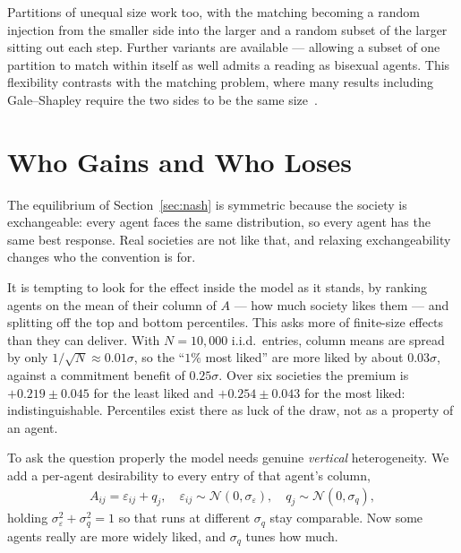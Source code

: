 \documentclass[sigconf,anonymous]{aamas}
\newcommand{\N}{\mathcal{N}}
\begin{document}
Partitions of unequal size work too, with the matching becoming a random
injection from the smaller side into the larger and a random subset of the
larger sitting out each step. Further variants are available --- allowing a
subset of one partition to match within itself as well admits a reading as
bisexual agents. This flexibility contrasts with the matching problem, where
many results including Gale--Shapley require the two sides to be the same
size~\cite{roth1992two}.


\section{Who Gains and Who Loses}
\label{sec:who}

The equilibrium of Section~\ref{sec:nash} is symmetric because the society is
exchangeable: every agent faces the same distribution, so every agent has the
same best response. Real societies are not like that, and relaxing
exchangeability changes who the convention is for.

It is tempting to look for the effect inside the model as it stands, by ranking
agents on the mean of their column of $A$ --- how much society likes them --- and
splitting off the top and bottom percentiles. This asks more of finite-size
effects than they can deliver. With $N = 10{,}000$ i.i.d.\ entries, column means
are spread by only $1/\sqrt{N} \approx 0.01\sigma$, so the ``$1\%$ most liked''
are more liked by about $0.03\sigma$, against a commitment benefit of
$0.25\sigma$. Over six societies the premium is $+0.219 \pm 0.045$ for the least
liked and $+0.254 \pm 0.043$ for the most liked: indistinguishable. Percentiles
exist there as luck of the draw, not as a property of an agent.

To ask the question properly the model needs genuine \emph{vertical}
heterogeneity. We add a per-agent desirability to every entry of that agent's
column,
%
\begin{align}
  A_{ij} = \varepsilon_{ij} + q_j,
  \quad
  \varepsilon_{ij} \sim \N(0, \sigma_\varepsilon),
  \quad
  q_j \sim \N(0, \sigma_q),
  \label{eq:quality}
\end{align}
%
holding $\sigma_\varepsilon^2 + \sigma_q^2 = 1$ so that runs at different
$\sigma_q$ stay comparable. Now some agents really are more widely liked, and
$\sigma_q$ tunes how much.
\end{document}
